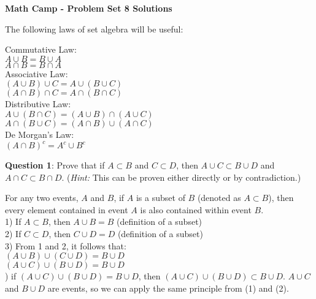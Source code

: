 \documentclass[12pt]{article}
\begin{document}
\centerline{\bf Math Camp - Problem Set 8 Solutions}

\bigskip
The following laws of set algebra will be useful:\\
\bigskip

Commutative Law:\\
$A\cup B = B \cup A$\\
$A\cap B = B \cap A$\\

Associative Law:\\
$(A\cup B) \cup C = A\cup (B \cup C)$\\
$(A\cap B) \cap C = A\cap (B \cap C)$\\


Distributive Law:\\
$A\cup (B\cap C) = (A\cup B) \cap (A \cup C)$\\
$A\cap (B\cup C) = (A\cap B) \cup (A \cap C)$\\

\bigskip
De Morgan's Law:\\
$(A \cap B)^c = A^c\cup B^c$\\


\bigskip

\noindent \textbf{Question 1}: Prove that if $A \subset B$ and $C \subset D$, then $A \cup C \subset B \cup D$ and $A \cap C \subset B \cap D$. (\textit{Hint:} This can be proven either directly or by contradiction.)

\bigskip
For any two events, $A$ and $B$, if $A$ is a subset of $B$ (denoted as $A\subset B$), then every element contained in event $A$ is also contained within event $B$.\\
1) If $A \subset B$, then $A \cup B=B$ (definition of a subset)\\
2) If $C \subset D$, then $C \cup D=D$ (definition of a subset)\\
3) From 1 and 2, it follows that:\\

$(A \cup B) \cup (C \cup D) = B \cup D$ \\


 $(A \cup C) \cup (B \cup D) = B \cup D$\\
 
 ) if $ (A \cup C)\cup (B \cup D) = B \cup D$, then $ (A \cup C)\cup (B \cup D) \subset B \cup D$. $A \cup C$ and $B \cup D$ are events, so we can apply the same principle from (1) and (2).\\

\bigskip
\end{document}
